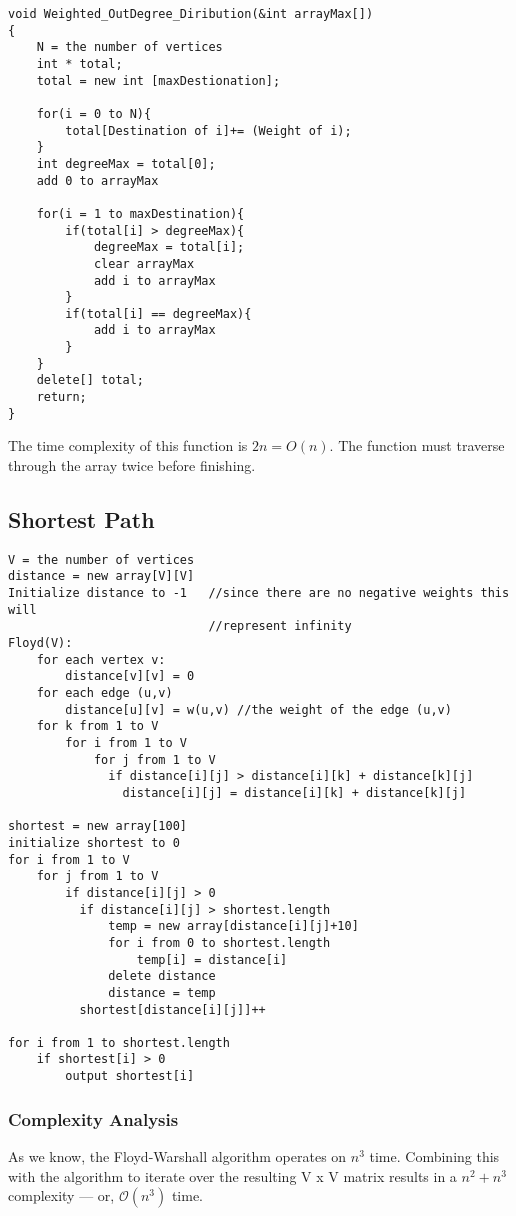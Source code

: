 \documentclass{article}
\begin{document}
\begin{verbatim}
void Weighted_OutDegree_Diribution(&int arrayMax[])
{
    N = the number of vertices
    int * total;
    total = new int [maxDestionation];

    for(i = 0 to N){
        total[Destination of i]+= (Weight of i);
    }
    int degreeMax = total[0];
    add 0 to arrayMax

    for(i = 1 to maxDestination){
        if(total[i] > degreeMax){
            degreeMax = total[i];
            clear arrayMax
            add i to arrayMax
        }
        if(total[i] == degreeMax){
            add i to arrayMax
        }
    }
    delete[] total;
    return;
}
\end{verbatim}

The time complexity of this function is $2n = O(n)$. The function must traverse through the array twice before finishing.

\subsection{Shortest Path}
\begin{verbatim}
V = the number of vertices
distance = new array[V][V]
Initialize distance to -1   //since there are no negative weights this will
                            //represent infinity
Floyd(V):
    for each vertex v:
        distance[v][v] = 0
    for each edge (u,v)
        distance[u][v] = w(u,v) //the weight of the edge (u,v)
    for k from 1 to V
        for i from 1 to V
            for j from 1 to V
              if distance[i][j] > distance[i][k] + distance[k][j]
                distance[i][j] = distance[i][k] + distance[k][j]

shortest = new array[100]
initialize shortest to 0
for i from 1 to V
    for j from 1 to V
        if distance[i][j] > 0
          if distance[i][j] > shortest.length
              temp = new array[distance[i][j]+10]
              for i from 0 to shortest.length
                  temp[i] = distance[i]
              delete distance
              distance = temp
          shortest[distance[i][j]]++

for i from 1 to shortest.length
    if shortest[i] > 0
        output shortest[i]
\end{verbatim}

\subsubsection{Complexity Analysis}
As we know, the Floyd-Warshall algorithm operates on $n^3$ time. Combining this with the algorithm to iterate over the resulting V x V matrix results in a $n^2 + n^3$ complexity --- or, $\mathcal{O}(n^3)$ time.
\end{document}
